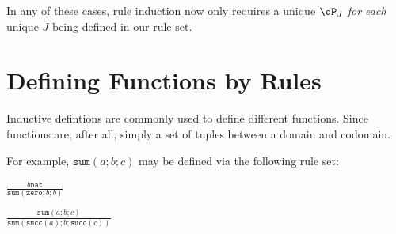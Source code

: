 \documentclass[11pt]{book}
\begin{document}
In any of these cases, rule induction now only requires a unique $\cP_J$ \textit{for each} unique $J$ being defined in our rule set.

\section{Defining Functions by Rules}

Inductive defintions are commonly used to define different functions. Since functions are, after all, simply a set of tuples between a domain and codomain.

For example, $\mathtt{sum}(a;b;c)$ may be defined via the following rule set:

$\frac{b \mathtt{nat}}{\mathtt{sum}(\mathtt{zero};b;b)}$

$\frac{\mathtt{sum}(a;b;c)}{\mathtt{sum}(\mathtt{succ}(a);b;\mathtt{succ}(c))}$
\end{document}
